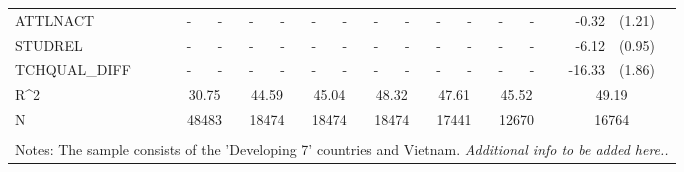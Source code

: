 \documentclass[10pt]{article}
\begin{document}
\begin{table}[htbp]
\begin{tabular}{lrlrlrlrlrlrlrl}
    ATTLNACT & \multicolumn{1}{c}{-} & \multicolumn{1}{c}{-} & \multicolumn{1}{c}{-} & \multicolumn{1}{c}{-} & \multicolumn{1}{c}{-} & \multicolumn{1}{c}{-} & \multicolumn{1}{c}{-} & \multicolumn{1}{c}{-} & \multicolumn{1}{c}{-} & \multicolumn{1}{c}{-} & \multicolumn{1}{c}{-} & \multicolumn{1}{c}{-} & -0.32 & (1.21) \\[0.2em]
    STUDREL & \multicolumn{1}{c}{-} & \multicolumn{1}{c}{-} & \multicolumn{1}{c}{-} & \multicolumn{1}{c}{-} & \multicolumn{1}{c}{-} & \multicolumn{1}{c}{-} & \multicolumn{1}{c}{-} & \multicolumn{1}{c}{-} & \multicolumn{1}{c}{-} & \multicolumn{1}{c}{-} & \multicolumn{1}{c}{-} & \multicolumn{1}{c}{-} & -6.12 & (0.95) \\[0.2em]
    TCHQUAL\_DIFF & \multicolumn{1}{c}{-} & \multicolumn{1}{c}{-} & \multicolumn{1}{c}{-} & \multicolumn{1}{c}{-} & \multicolumn{1}{c}{-} & \multicolumn{1}{c}{-} & \multicolumn{1}{c}{-} & \multicolumn{1}{c}{-} & \multicolumn{1}{c}{-} & \multicolumn{1}{c}{-} & \multicolumn{1}{c}{-} & \multicolumn{1}{c}{-} & -16.33 & (1.86) \\[0.2em]
    
    R^{2}   & \multicolumn{2}{c}{30.75} & \multicolumn{2}{c}{44.59} & \multicolumn{2}{c}{45.04} & \multicolumn{2}{c}{48.32} & \multicolumn{2}{c}{47.61} & \multicolumn{2}{c}{45.52} & \multicolumn{2}{c}{49.19} \\
    N     & \multicolumn{2}{c}{48483} & \multicolumn{2}{c}{18474} & \multicolumn{2}{c}{18474} & \multicolumn{2}{c}{18474} & \multicolumn{2}{c}{17441} & \multicolumn{2}{c}{12670} & \multicolumn{2}{c}{16764} \\
    
    \bottomrule
    \\
    \multicolumn{15}{l}{Notes: The sample consists of the 'Developing 7' countries and Vietnam. \textit{Additional info to be added here..}}\\
    
\end{tabular}%
\label{tab:addlabel}%
\end{table}%
\end{document}

